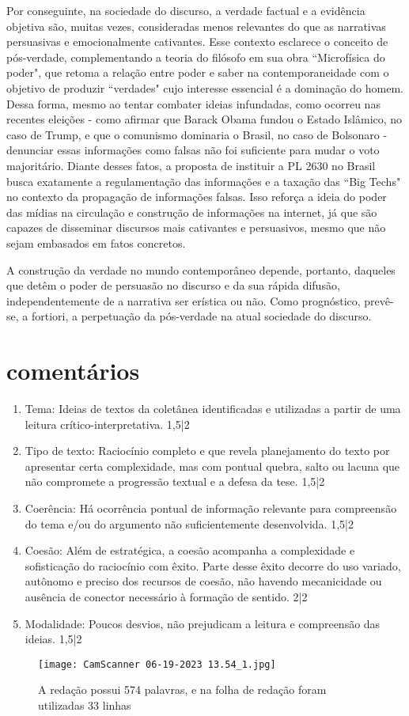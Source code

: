 \documentclass{article}
\begin{document}
Por conseguinte, na sociedade do discurso, a verdade factual e a evidência objetiva são, muitas vezes, consideradas menos relevantes do que as narrativas persuasivas e emocionalmente cativantes. Esse contexto esclarece o conceito de pós-verdade, complementando a teoria do filósofo em sua obra “Microfísica do poder", que retoma a relação entre poder e saber na contemporaneidade com o objetivo de produzir “verdades" cujo interesse essencial é a dominação do homem. Dessa forma, mesmo ao tentar combater ideias infundadas, como ocorreu nas recentes eleições - como afirmar que Barack Obama fundou o Estado Islâmico, no caso de Trump, e que o comunismo dominaria o Brasil, no caso de Bolsonaro - denunciar essas informações como falsas não foi suficiente para mudar o voto majoritário. Diante desses fatos, a proposta de instituir a PL 2630 no Brasil busca exatamente a regulamentação das informações e a taxação das “Big Techs" no contexto da propagação de informações falsas. Isso reforça a ideia do poder das mídias na circulação e construção de informações na internet, já que são capazes de disseminar discursos mais cativantes e persuasivos, mesmo que não sejam embasados em fatos concretos.

A construção da verdade no mundo contemporâneo depende, portanto, daqueles que detêm o poder de persuasão no discurso e da sua rápida difusão, independentemente de a narrativa ser erística ou não. Como prognóstico, prevê-se, a fortiori, a perpetuação da pós-verdade na atual sociedade do discurso.
\newpage
\section*{comentários}
\begin{enumerate}
\item Tema: Ideias de textos da coletânea identificadas e utilizadas a partir de uma leitura crítico-interpretativa. 1,5|2
\item Tipo de texto: Raciocínio completo e que revela planejamento do texto por apresentar certa complexidade, mas com pontual quebra, salto ou lacuna que não compromete a progressão textual e a defesa da tese. 1,5|2
\item Coerência: Há ocorrência pontual de informação relevante para compreensão do tema e/ou do argumento não suficientemente desenvolvida. 1,5|2
\item Coesão: Além de estratégica, a coesão acompanha a complexidade e sofisticação do raciocínio com êxito. Parte desse êxito decorre do uso variado, autônomo e preciso dos recursos de coesão, não havendo mecanicidade ou ausência de conector necessário à formação de sentido. 2|2
\item Modalidade: Poucos desvios, não prejudicam a leitura e compreensão das ideias. 1,5|2



\end{enumerate}
\begin{figure}
\centering
\texttt{[image: CamScanner 06-19-2023 13.54\_1.jpg]}
\caption{\label{}A redação possui 574 palavras, e na folha de redação foram utilizadas 33 linhas}
\end{figure}
\end{document}
